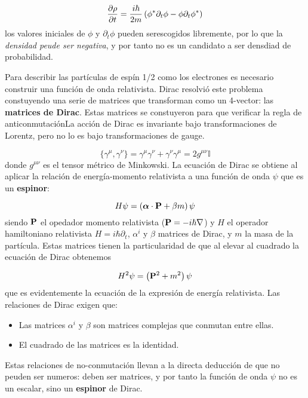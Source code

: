 \begin{equation*}
    \frac{\partial \rho}{\partial t} = \frac{i\hbar}{2m} \left( \phi^* \partial_t \phi - \phi \partial_t \phi^* \right)
\end{equation*}
los valores iniciales de $\phi$ y $\partial_t \phi$ pueden serescogidos libremente, por lo que la \textit{densidad peude ser negativa}, y por tanto no es un candidato a ser densdiad de probabilidad. 


Para describir las partículas de espín 1/2 como los electrones es necesario construir una función de onda relativista. Dirac resolvió este problema constuyendo una serie de matrices que transforman como un 4-vector: las \textbf{matrices de Dirac}. Estas matrices se constuyeron para que verificar la regla de anticonmutaciónLa acción de Dirac es invariante bajo transformaciones de Lorentz, pero no lo es bajo transformaciones de gauge.

\begin{equation*}
   \{ \gamma^\mu ,\gamma^\nu \} = \gamma^\mu \gamma^\nu + \gamma^\nu \gamma^\mu = 2 g^{\mu\nu} \mathbb{I}
\end{equation*}
donde $g^{\mu\nu}$ es el tensor métrico de Minkowski. La ecuación de Dirac se obtiene al aplicar la relación de energía-momento relativista a una función de onda $\psi$ que es un \textbf{espinor}:

\begin{equation*}
    H \psi = \left( \boldsymbol{\alpha} \cdot \mathbf{P} + \beta m  \right) \psi
\end{equation*}
siendo $\mathbf{P}$ el opedador momento relativista ($\mathbf{P} = -i \hbar \nabla$) y $H$ el operador hamiltoniano relativista $H=i \hbar \partial_t$, $\alpha^i$ y $\beta$ matrices de Dirac, y $m$ la masa de la partícula. Estas matrices tienen la particularidad de que al elevar al cuadrado la ecuación de Dirac obtenemos 

\begin{equation*}
    H^2 \psi = \left( \mathbf{P}^2 + m^2 \right) \psi 
\end{equation*}
que es evidentemente la ecuación de la expresión de energía relativista. Las relaciones de Dirac exigen que:

\begin{itemize}
    \item Las matrices $\alpha^i$ y $\beta$ son matrices complejas que conmutan entre ellas. 
    \item El cuadrado de las matrices es la identidad. 
\end{itemize}
Estas relaciones de no-conmutación llevan a la directa deducción de que no peuden ser numeros: deben ser matrices, y por tanto la función de onda $\psi$ no es un escalar, sino un \textbf{espinor} de Dirac. 

